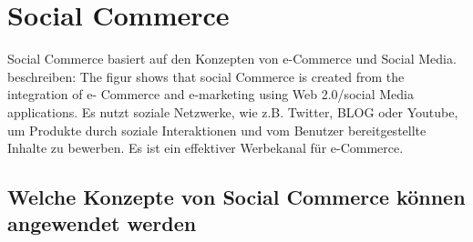 \section{Social Commerce}

Social Commerce basiert auf den Konzepten von e-Commerce und Social Media. \textcite[S. 8]{turban:sc} beschreiben: \glqq{}The figur shows that social Commerce is created from the integration of e- Commerce and e-marketing using  Web 2.0/social Media applications.\grqq{} Es nutzt soziale Netzwerke, wie z.B. Twitter, BLOG oder Youtube, um Produkte durch soziale Interaktionen und vom Benutzer bereitgestellte Inhalte zu bewerben. Es ist ein effektiver Werbekanal für e-Commerce.


\subsection{Welche Konzepte von Social Commerce können angewendet werden}

